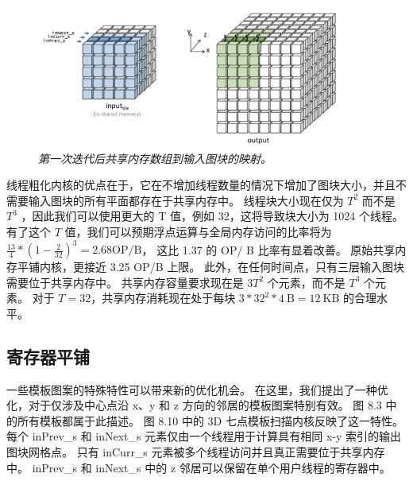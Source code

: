 \begin{figure}[H]
	\centering
	\includegraphics[width=0.9\textwidth]{figs/F8.11.png}
	\caption{\textit{第一次迭代后共享内存数组到输入图块的映射。}}
\end{figure}

线程粗化内核的优点在于，它在不增加线程数量的情况下增加了图块大小，并且不需要输入图块的所有平面都存在于共享内存中。 
线程块大小现在仅为 $T^2$ 而不是 $T^3$ ，因此我们可以使用更大的 T 值，例如 32，这将导致块大小为 1024 个线程。 
有了这个 $T$ 值，我们可以预期浮点运算与全局内存访问的比率将为 
$\frac{13}{4} *\left(1-\frac{2}{32}\right)^{3}=2.68 \mathrm{OP} / \mathrm{B}$，
这比 1.37 的 OP/ B 比率有显着改善。 原始共享内存平铺内核，更接近 3.25 OP/B 上限。 
此外，在任何时间点，只有三层输入图块需要位于共享内存中。 共享内存容量要求现在是 $3T^2$ 个元素，而不是 $T^3$ 个元素。 
对于 $T = 32$，共享内存消耗现在处于每块 $3 * 32^{2} * 4 \mathrm{~B}=12 \mathrm{~KB}$ 的合理水平。

\subsection{寄存器平铺}
一些模板图案的特殊特性可以带来新的优化机会。 
在这里，我们提出了一种优化，对于仅涉及中心点沿 x、y 和 z 方向的邻居的模板图案特别有效。 
图 8.3 中的所有模板都属于此描述。 图 8.10 中的 3D 七点模板扫描内核反映了这一特性。 
每个 inPrev\_s 和 inNext\_s 元素仅由一个线程用于计算具有相同 x-y 索引的输出图块网格点。 
只有 inCurr\_s 元素被多个线程访问并且真正需要位于共享内存中。 
inPrev\_s 和 inNext\_s 中的 z 邻居可以保留在单个用户线程的寄存器中。

